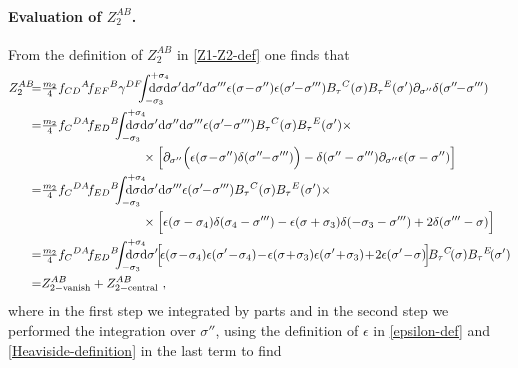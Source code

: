 \documentclass[12pt]{article}
\numberwithin{equation}{section}
\begin{document}
\paragraph{Evaluation of $Z_{2}^{AB}$.}
From the definition of $Z_{2}^{AB}$ in \eqref{Z1-Z2-def} one finds that
\begin{align}\label{Z2AB-intermediate}
Z_{2}^{AB}\!\!\!=&\tfrac{m_{2}}{4}f_{CD}{}^{A}\!f_{EF}{}^{B}\gamma^{DF}\!\!\!\int_{-\sigma_{3}}^{+\sigma_{4}}\!\!\!\!\!\!\!\!\!\!\!\mathrm{d}\sigma\mathrm{d}\sigma' \mathrm{d}\sigma''\mathrm{d}\sigma'''   \epsilon(\sigma\!-\!\sigma'')\epsilon(\sigma'\!\!-\!\sigma''')B_{\tau}{}^{C}(\sigma)B_{\tau}{}^{E}(\sigma')\partial_{\sigma''}\delta(\sigma''\!\!-\!\sigma''') \,\,
\notag \\
=&\tfrac{m_{2}}{4}f_{C}{}^{DA}\!f_{ED}{}^{B}\!\!\!\int_{-\sigma_{3}}^{+\sigma_{4}}\!\!\!\!\!\!\!\!\!\!\!\mathrm{d}\sigma\mathrm{d}\sigma' \mathrm{d}\sigma''\mathrm{d}\sigma'''   \epsilon(\sigma'\!\!-\!\sigma''')B_{\tau}{}^{C}(\sigma)B_{\tau}{}^{E}(\sigma')\times
\notag \\
&\qquad\qquad\qquad\qquad \times\Bigl[\partial_{\sigma''}\Bigl(\epsilon(\sigma\!-\!\sigma'')\delta(\sigma''\!\!-\!\sigma''')\Bigr)-\delta(\sigma''-\sigma''')\partial_{\sigma''}\epsilon(\sigma-\sigma'')\Bigr]
\notag \\
=&\tfrac{m_{2}}{4}f_{C}{}^{DA}\!f_{ED}{}^{B}\!\!\!\int_{-\sigma_{3}}^{+\sigma_{4}}\!\!\!\!\!\!\!\!\!\!\!\mathrm{d}\sigma\mathrm{d}\sigma' \mathrm{d}\sigma'''   \epsilon(\sigma'\!\!-\!\sigma''')B_{\tau}{}^{C}(\sigma)B_{\tau}{}^{E}(\sigma')\times
\notag \\
&\qquad\qquad\qquad\qquad \times 
\Bigl[ \epsilon(\sigma-\sigma_{4})\delta(\sigma_{4}-\sigma''')-\epsilon(\sigma+\sigma_{3})\delta(-\sigma_{3}-\sigma''')+2\delta(\sigma'''-\sigma) \Bigr]
\notag \\
=&\tfrac{m_{2}}{4}f_{C}{}^{DA}\!f_{ED}{}^{B}\!\!\!\int_{-\sigma_{3}}^{+\sigma_{4}}\!\!\!\!\!\!\!\!\!\!\!\mathrm{d}\sigma\mathrm{d}\sigma' \! \Bigl[ \! \epsilon(\sigma\!-\!\sigma_{4})\epsilon(\sigma'\!-\!\sigma_{4})\!-\!\epsilon(\sigma\!+\!\sigma_{3})\epsilon(\sigma'\!+\!\sigma_{3})\!+\!2\epsilon(\sigma'\!-\!\sigma)\!\Bigr]\!B_{\tau}{}^{C}\!(\sigma)B_{\tau}{}^{E}\!(\sigma')
\notag \\
=& Z_{2-\text{vanish}}^{AB}+Z_{2-\text{central}}^{AB} \,\, ,
\end{align}
where in the first step we integrated by parts and in the second step we performed the integration over $\sigma''$, using the definition of $\epsilon$ in \eqref{epsilon-def} and \eqref{Heaviside-definition} in the last term to find
\end{document}
